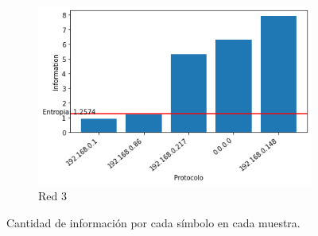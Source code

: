 \begin{figure}[H]
\begin{subfigure}{0.5\linewidth}
        \includegraphics[scale=0.45]{images/resultados_generales/red_3_info.png}
        \caption{Red 3}
    \end{subfigure}
    \caption{Cantidad de información por cada símbolo en cada muestra.}
    \label{fig: informacion de los simbolos}
\end{figure}